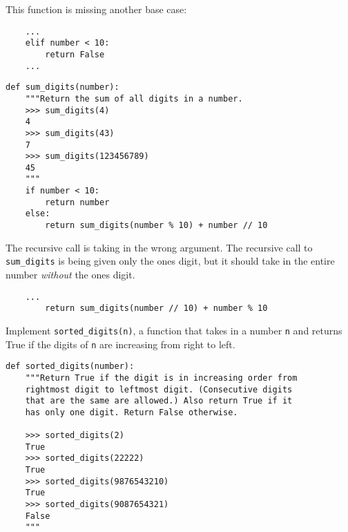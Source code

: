 \documentclass{exam}
\begin{document}
\begin{questions}
\begin{blocksection}
\begin{solution}[1.0in]
This function is missing another base case:

\begin{lstlisting}
    ...
    elif number < 10:
        return False
    ...
\end{lstlisting}
\end{solution}
\end{blocksection}

\begin{blocksection}
\begin{lstlisting}
def sum_digits(number):
    """Return the sum of all digits in a number.
    >>> sum_digits(4)
    4
    >>> sum_digits(43)
    7
    >>> sum_digits(123456789)
    45
    """
    if number < 10:
        return number
    else:
        return sum_digits(number % 10) + number // 10
\end{lstlisting}
\end{blocksection}

\begin{blocksection}
\begin{solution}[0.5in]
The recursive call is taking in the wrong argument. The recursive call to
\texttt{sum\_digits} is being given only the ones digit, but it should take
in the entire number \emph{without} the ones digit.

\begin{lstlisting}
    ...
        return sum_digits(number // 10) + number % 10
\end{lstlisting}
\end{solution}
\end{blocksection}

\begin{blocksection}
\question Implement \texttt{sorted\_digits(n)}, a function that takes in a
number \texttt{n} and returns True if the digits of \texttt{n} are increasing
from right to left.

\begin{lstlisting}
def sorted_digits(number):
    """Return True if the digit is in increasing order from
    rightmost digit to leftmost digit. (Consecutive digits
    that are the same are allowed.) Also return True if it
    has only one digit. Return False otherwise.

    >>> sorted_digits(2)
    True
    >>> sorted_digits(22222)
    True
    >>> sorted_digits(9876543210)
    True
    >>> sorted_digits(9087654321)
    False
    """
\end{lstlisting}


\end{blocksection}
\end{questions}
\end{document}
